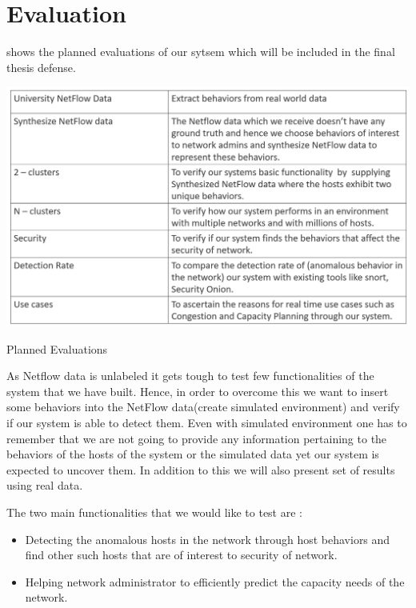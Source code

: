 \section{Evaluation}

 shows the planned evaluations of our sytsem which will be included in the final thesis defense.

\begin{table}[ht]
	\centerline{\includegraphics[scale = 0.6]{evaluation.png}}
	\caption{Planned Evaluations}%
\end{table}


As Netflow data is unlabeled it gets tough to test few functionalities of the system
that we have built. Hence, in order to overcome this we want to insert some behaviors
into the NetFlow data(create simulated environment) and verify if our system is able to
detect them. Even with simulated environment one has to remember that we are not going
to provide any information pertaining to the behaviors of the hosts of the system or the
simulated data yet our system is expected to uncover them. In addition to this we will also
present set of results using real data.




The two main functionalities that we would like to test are :
\begin{itemize}
	
	\item Detecting the anomalous hosts in the network through host behaviors and find other
	such hosts that are of interest to security of network.
	
	\item Helping network administrator to efficiently predict the capacity needs of the network.
\end{itemize}

